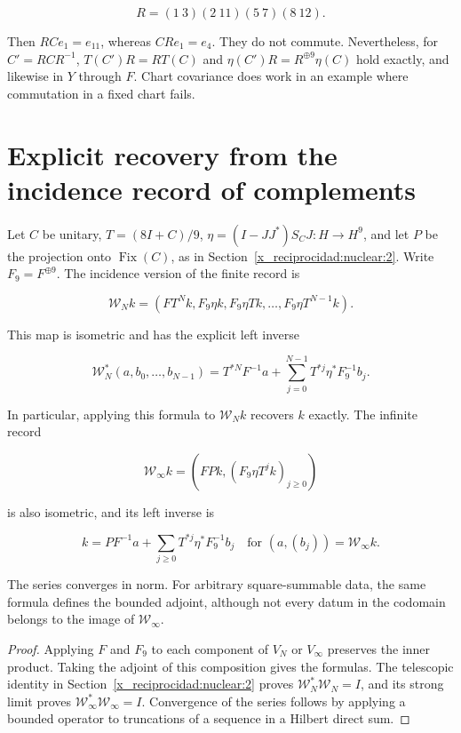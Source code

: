 \[
R=(1\ 3)(2\ 11)(5\ 7)(8\ 12).
\]

Then \(RCe_1=e_{11}\), whereas \(CRe_1=e_4\). They do not commute. Nevertheless, for \(C'=RCR^{-1}\), \(T(C')R=RT(C)\) and \(\eta(C')R=R^{\oplus9}\eta(C)\) hold exactly, and likewise in \(Y\) through \(F\). Chart covariance does work in an example where commutation in a fixed chart fails.

\section{Explicit recovery from the incidence record of complements}\label{x_reciprocidad:nuc05:recuperacion}

Let \(C\) be unitary, \(T=(8I+C)/9\), \(\eta=(I-JJ^*)S_CJ:H\to H^9\), and let \(P\) be the projection onto \(\operatorname{Fix}(C)\), as in Section~\ref{x_reciprocidad:nuclear:2}. Write \(F_9=F^{\oplus9}\). The incidence version of the finite record is

\[
\mathcal W_Nk=\left(FT^Nk,F_9\eta k,F_9\eta Tk,\ldots,F_9\eta T^{N-1}k\right).
\]

\begin{theorem}
This map is isometric and has the explicit left inverse

\[
\mathcal W_N^*(a,b_0,\ldots,b_{N-1})
=T^{*N}F^{-1}a+
\sum_{j=0}^{N-1}T^{*j}\eta^*F_9^{-1}b_j.
\]

In particular, applying this formula to \(\mathcal W_Nk\) recovers \(k\) exactly. The infinite record

\[
\mathcal W_\infty k=\left(FPk,(F_9\eta T^jk)_{j\ge0}\right)
\]

is also isometric, and its left inverse is

\[
k=PF^{-1}a+\sum_{j\ge0}T^{*j}\eta^*F_9^{-1}b_j
\quad\text{for }(a,(b_j))=\mathcal W_\infty k.
\]

The series converges in norm. For arbitrary square-summable data, the same formula defines the bounded adjoint, although not every datum in the codomain belongs to the image of \(\mathcal W_\infty\).
\end{theorem}

\begin{proof}
Applying \(F\) and \(F_9\) to each component of \(V_N\) or \(V_\infty\) preserves the inner product. Taking the adjoint of this composition gives the formulas. The telescopic identity in Section~\ref{x_reciprocidad:nuclear:2} proves \(\mathcal W_N^*\mathcal W_N=I\), and its strong limit proves \(\mathcal W_\infty^*\mathcal W_\infty=I\). Convergence of the series follows by applying a bounded operator to truncations of a sequence in a Hilbert direct sum.
\end{proof}


